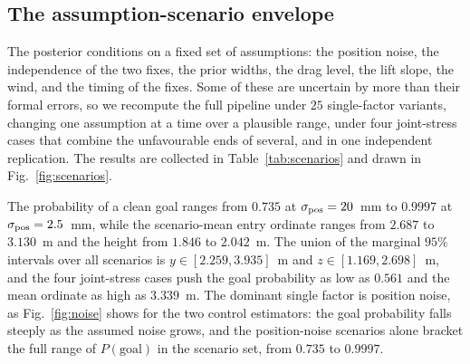 \subsection{The assumption-scenario envelope}
\label{sec:scenarios}
\label{sec:envelope}

The posterior conditions on a fixed set of assumptions: the position noise, the
independence of the two fixes, the prior widths, the drag level, the lift slope,
the wind, and the timing of the fixes. Some of these are uncertain by more than
their formal errors, so we recompute the full pipeline under $25$ single-factor
variants, changing one assumption at a time over a plausible range, under four
joint-stress cases that combine the unfavourable ends of several, and in one
independent replication. The
results are collected in Table~\ref{tab:scenarios} and drawn in
Fig.~\ref{fig:scenarios}.

The probability of a clean goal ranges from $0.735$ at
$\sigma_{\rm pos}=20$~mm to $0.9997$ at $\sigma_{\rm pos}=2.5$~mm, while the
scenario-mean entry ordinate ranges from $2.687$ to $3.130$~m and the height from
$1.846$ to $2.042$~m. The union of the marginal $95\%$ intervals over all
scenarios is $y\in[2.259,3.935]$~m and $z\in[1.169,2.698]$~m, and the four
joint-stress cases push the goal probability as low as $0.561$ and the mean
ordinate as high as $3.339$~m. The dominant single factor is position noise, as
Fig.~\ref{fig:noise} shows for the two control estimators: the goal probability
falls steeply as the assumed noise grows, and the position-noise scenarios
alone bracket the full range of $P(\text{goal})$ in the scenario set, from
$0.735$ to $0.9997$.

